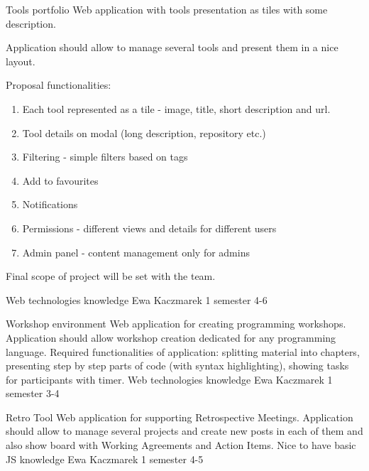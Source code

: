 \begin{project}
{Tools portfolio}
{Web application with tools presentation as tiles with some description.} 
{
Application should allow to manage several tools and present them in a nice layout.

Proposal functionalities:

\begin{enumerate}
	\item Each tool represented as a tile - image, title, short description and url.
	\item Tool details on modal (long description, repository etc.)
	\item Filtering - simple filters based on tags
	\item Add to favourites
	\item Notifications
	\item Permissions - different views and details for different users
	\item Admin panel - content management only for admins
\end{enumerate}

Final scope of project will be set with the team.
}
{Web technologies knowledge}
{Ewa Kaczmarek}
{1 semester}
{4-6}
\end{project}
\begin{project}
{Workshop environment}
{Web application for creating programming workshops.} 
{
Application should allow workshop creation dedicated for any programming language. Required functionalities of application: splitting material into chapters, presenting step by step parts of code (with syntax highlighting), showing tasks for participants with timer.
}
{Web technologies knowledge}
{Ewa Kaczmarek}
{1 semester}
{3-4}
\end{project}
\begin{project}
{Retro Tool}
{Web application for supporting Retrospective Meetings.}
{
Application should allow to manage several projects and create new posts in each of them and also show board with Working Agreements and Action Items.
}
{Nice to have basic JS knowledge}
{Ewa Kaczmarek}
{1 semester}
{4-5}
\end{project}
